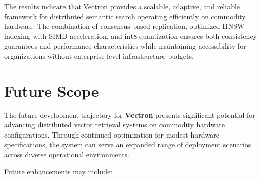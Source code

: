 The results indicate that Vectron provides a scalable, adaptive, and reliable framework for distributed semantic search operating efficiently on commodity hardware. The combination of consensus-based replication, optimized HNSW indexing with SIMD acceleration, and int8 quantization ensures both consistency guarantees and performance characteristics while maintaining accessibility for organizations without enterprise-level infrastructure budgets.

\section{Future Scope}

The future development trajectory for \textbf{Vectron} presents significant potential for advancing distributed vector retrieval systems on commodity hardware configurations. Through continued optimization for modest hardware specifications, the system can serve an expanded range of deployment scenarios across diverse operational environments.

Future enhancements may include:


